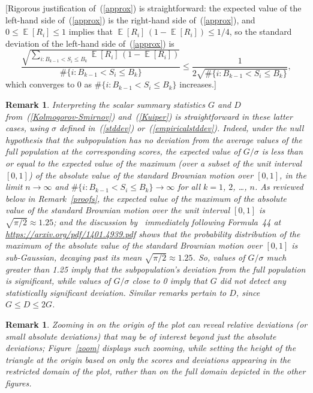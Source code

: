 \documentclass{article}
\newtheorem{remark1}[theorem]{Remark}
\newenvironment{remark}{\begin{remark1} \rm}{\end{remark1}}
\DeclareMathOperator{\E}{\mathop{}\mathbb{E}}
\begin{document}
[Rigorous justification of~(\ref{approx}) is straightforward:
the expected value of the left-hand side of~(\ref{approx})
is the right-hand side of~(\ref{approx}), and
$0 \le \E[ R_i ] \le 1$ implies that $\E[ R_i ] \, (1-\E[ R_i ]) \le 1/4$, so
the standard deviation of the left-hand side of~(\ref{approx}) is
%
\begin{equation}
\frac{\sqrt{\sum_{i : B_{k-1} < S_i \le B_k} \E[ R_i ] \, (1-\E[ R_i ])}}
     {\#\{i : B_{k-1} < S_i \le B_k\}}
\le \frac{1}{2 \sqrt{\#\{i : B_{k-1} < S_i \le B_k\}}},
\end{equation}
%
which converges to 0 as $\#\{i : B_{k-1} < S_i \le B_k\}$ increases.]

\begin{remark}
\label{interpretation}
Interpreting the scalar summary statistics $G$ and $D$
from~(\ref{Kolmogorov-Smirnov}) and~(\ref{Kuiper}) is straightforward
in these latter cases, using $\sigma$ defined in~(\ref{stddev})
or~(\ref{empiricalstddev}).
Indeed, under the null hypothesis that the subpopulation has no deviation
from the average values of the full population at the corresponding scores,
the expected value of $G/\sigma$ is less than or equal to the expected value
of the maximum (over a subset of the unit interval $[0, 1]$)
of the absolute value of the standard Brownian motion over $[0, 1]$,
in the limit $n \to \infty$ and $\#\{i : B_{k-1} < S_i \le B_k\} \to \infty$
for all $k = 1$, $2$, \dots, $n$.
As reviewed below in Remark~\ref{proofs},
the expected value of the maximum of the absolute value
of the standard Brownian motion over the unit interval $[0, 1]$
is $\sqrt{\pi/2} \approx 1.25$;
and the discussion by~\cite{masoliver} immediately following Formula~44
at \url{https://arxiv.org/pdf/1401.4939.pdf} shows that
the probability distribution of the maximum of the absolute value
of the standard Brownian motion over $[0, 1]$ is sub-Gaussian,
decaying past its mean $\sqrt{\pi/2} \approx 1.25$.
So, values of $G/\sigma$ much greater than 1.25 imply that
the subpopulation's deviation from the full population is significant,
while values of $G/\sigma$ close to 0 imply that
$G$ did not detect any statistically significant deviation.
Similar remarks pertain to $D$, since $G \le D \le 2G$.
\end{remark}

\begin{remark}
\label{zooming}
Zooming in on the origin of the plot can reveal relative deviations
(or small absolute deviations)
that may be of interest beyond just the absolute deviations;
Figure~\ref{zoom} displays such zooming, while setting the height
of the triangle at the origin based on only the scores and deviations appearing
in the restricted domain of the plot, rather than on the full domain depicted
in the other figures.
\end{remark}
\end{document}
